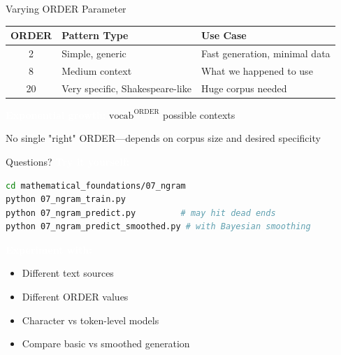 \documentclass[aspectratio=169]{beamer}
\renewcommand{\textbf}[1]{\textcolor{white}{\bfseries #1}}
\begin{document}
\begin{frame}{Varying ORDER Parameter}
\begin{tabular}{|c|l|l|}
\hline
\rowcolor{codebg}
ORDER & Pattern Type & Use Case \\
\hline
2 & Simple, generic & Fast generation, minimal data \\
8 & Medium context & What we happened to use \\
20 & Very specific, Shakespeare-like & Huge corpus needed \\
\hline
\end{tabular}

\vspace{1em}
\textbf{Exponential growth:} $\text{vocab}^{\text{ORDER}}$ possible contexts

\vspace{0.5em}
{\small No single "right" ORDER—depends on corpus size and desired specificity}
\end{frame}

\begin{frame}[fragile]{Questions?}
\textbf{Try it yourself:}
\begin{lstlisting}[language=bash]
cd mathematical_foundations/07_ngram
python 07_ngram_train.py
python 07_ngram_predict.py         # may hit dead ends
python 07_ngram_predict_smoothed.py # with Bayesian smoothing
\end{lstlisting}

\vspace{1em}
\textbf{Experiment with:}
\begin{itemize}
    \item Different text sources
    \item Different ORDER values
    \item Character vs token-level models
    \item Compare basic vs smoothed generation
\end{itemize}
\end{frame}
\end{document}
